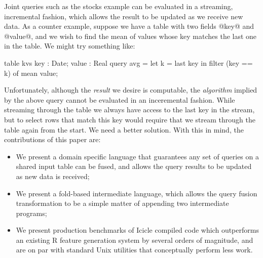 Joint queries such as the stocks example can be evaluated in a streaming, incremental fashion, which allows the result to be updated as we receive new data. As a counter example, suppose we have a table with two fields @key@ and @value@, and we wish to find the mean of values whose key matches the last one in the table. We might try something like:
\begin{code}
  table kvs { key : Date; value : Real }
  query avg = let k = last key
              in  filter (key == k) of mean value;
\end{code}
Unfortunately, although the \emph{result} we desire is computable, the \emph{algorithm} implied by the above query cannot be evaluated in an inceremental fashion. While streaming through the table we always have access to the last key in the stream, but to select rows that match this key would require that we stream through the table again from the start. We need a better solution. With this in mind, the contributions of this paper are:
\begin{itemize}
\item
We present a domain specific language that guarantees any set of queries on a shared input table can be fused, and allows the query results to be updated as new data is received;

\item
We present a fold-based intermediate language, which allows the query fusion transformation to be a simple matter of appending two intermediate programs;

\item
We present production benchmarks of Icicle compiled code which outperforms an existing R feature generation system by several orders of magnitude, and are on par with standard Unix utilities that conceptually perform less work.
\end{itemize}




